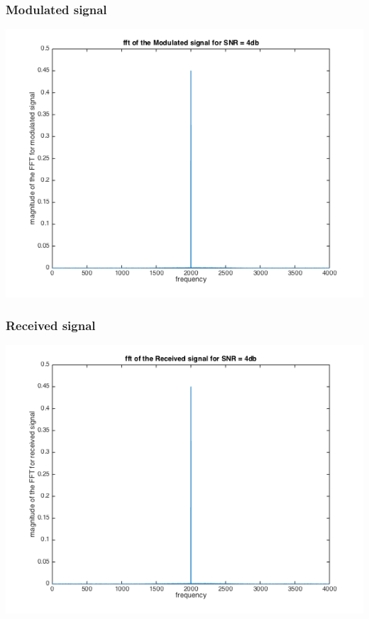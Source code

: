 \documentclass[11pt]{scrartcl}
\begin{document}
\subsubsection{Modulated signal}
\begin{minipage}[t]{\linewidth}
{
\includegraphics[scale = 0.6]{modulated_signal_fft.png}
}
\end{minipage}
\medskip

\subsubsection{Received signal}
\begin{minipage}[t]{\linewidth}
{
\includegraphics[scale = 0.6]{received_signal_fft.png}
}
\end{minipage}
\medskip
\end{document}
